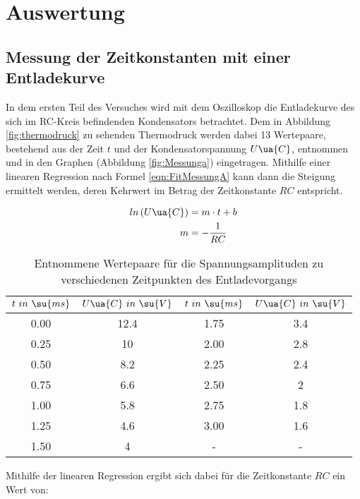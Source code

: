 \section{Auswertung}

\subsection{Messung der Zeitkonstanten mit einer Entladekurve}

In dem ersten Teil des Versuches wird mit dem Oszilloskop die Entladekurve des
sich im RC-Kreis befindenden Kondensators betrachtet. Dem in Abbildung \ref{fig:thermodruck}
zu sehenden Thermodruck werden dabei 13 Wertepaare, bestehend aus der Zeit $t$
und der Kondensatorspannung $U\ua{C}$, entnommen und in den Graphen
(Abbildung \ref{fig:Messunga}) eingetragen. Mithilfe einer linearen Regression nach
Formel \eqref{eqn:FitMessungA} kann dann die Steigung ermittelt werden, deren
Kehrwert im Betrag der Zeitkonstante $RC$ entspricht.

\begin{align}
  \label{eqn:FitMessungA}
  ln \left( U\ua{C} \right) &= m \cdot t + b \\
  m    &= -\frac{1}{RC}
\end{align}

\begin{table}
  \centering
  \caption{Entnommene Wertepaare für die Spannungsamplituden zu verschiedenen
          Zeitpunkten des Entladevorgangs}
  \label{tab:MessungA}
  \begin{tabular}{c c || c c}
    \toprule $t \,\, in \,\, \su{ms}$ & $U\ua{C} \,\, in \,\, \su{V}$ &
             $t \,\, in \,\, \su{ms}$ & $U\ua{C} \,\, in \,\, \su{V}$ \\
    \midrule
    0.00 & 12.4 & 1.75 & 3.4 \\
    0.25 & 10   & 2.00 & 2.8 \\
    0.50 &  8.2 & 2.25 & 2.4 \\
    0.75 &  6.6 & 2.50 & 2   \\
    1.00 &  5.8 & 2.75 & 1.8 \\
    1.25 &  4.6 & 3.00 & 1.6 \\
    1.50 &  4   & -    & -   \\
    \bottomrule
  \end{tabular}
\end{table}

Mithilfe der linearen Regression ergibt sich dabei für die Zeitkonstante $RC$ ein
Wert von:

